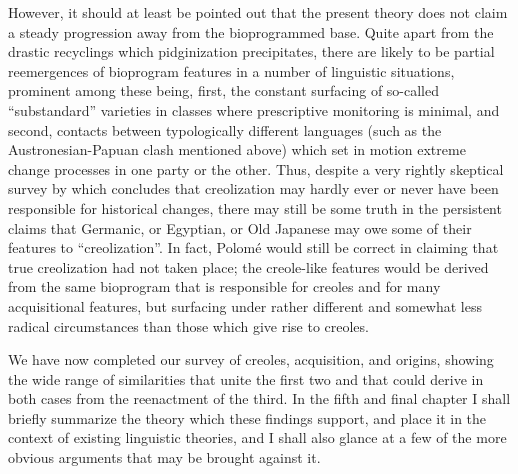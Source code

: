 However, it should at least be pointed out that the present theory does not claim a steady progression away from the bioprogrammed base. Quite apart from the drastic recyclings which pidginization precipitates, there are likely to be partial reemergences of bioprogram features in a number of linguistic situations, prominent among these being, first, the constant surfacing of so-called ``substandard'' varieties in classes where prescriptive monitoring is minimal, and second, contacts between typologically different languages (such as the Austronesian-Papuan clash mentioned above) which set in motion extreme change processes in one party or the other. Thus, despite a very rightly skeptical survey by \citet{Polome1980} which concludes that creolization may hardly ever or never have been responsible for historical changes, there may still be some truth in the persistent claims that Germanic, or Egyptian, or Old Japanese may owe some of their features to ``creolization''. In fact, Polomé would still be correct in claiming that true creolization had not taken place; the creole-like features would be derived from the same bioprogram that is responsible for creoles and for many acquisitional features, but surfacing under rather different and somewhat less radical circumstances than those which give rise to creoles.

We have now completed our survey of creoles, acquisition, and origins, showing the wide range of similarities that unite the first two and that could derive in both cases from the reenactment of the third. In the fifth and final chapter I shall briefly summarize the theory which these findings support, and place it in the context of existing linguistic theories, and I shall also glance at a few of the more obvious arguments that may be brought against it.

